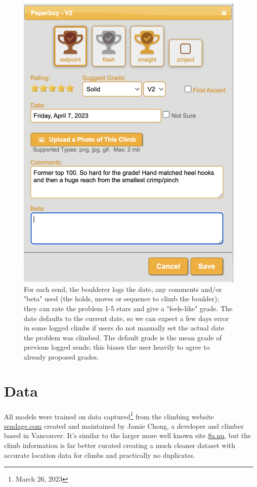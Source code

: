 \documentclass[10pt]{article}
\begin{document}
\begin{figure}[h]
  \centering
  \includegraphics[scale=0.4]{sendage.png}
  \caption{For each send, the boulderer logs the date, any comments and/or "beta" used (the holds, moves or sequence to climb the boulder); they can rate the problem 1-5 stars and give a "feels-like" grade. The date defaults to the current date, so we can expect a few days error in some logged climbs if users do not manually set the actual date the problem was climbed. The default grade is the mean grade of previous logged sends; this biases the user heavily to agree to already proposed grades.}
  \label{fig:sendage}
\end{figure}


\section{Data}

All models were trained on data captured\footnote[2]{March 26, 2023} from the climbing website \href{https://sendage.com}{sendage.com} created and maintained by Jamie Chong, a developer and climber based in Vancouver. It's similar to the larger more well known site \href{https://www.8a.nu/}{8a.nu}, but the climb information is far better curated creating a much cleaner dataset with accurate location data for climbs and practically no duplicates. 
\end{document}
